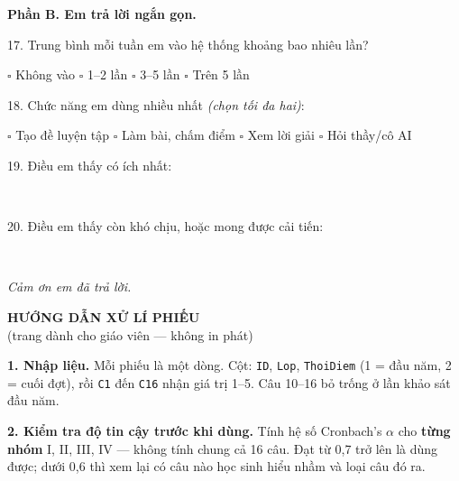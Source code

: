 \documentclass[12pt,a4paper]{article}
\begin{document}
\vspace{4pt}
\textbf{Phần B. Em trả lời ngắn gọn.}

\vspace{4pt}
17. Trung bình mỗi tuần em vào hệ thống khoảng bao nhiêu lần?

\quad $\square$ Không vào \quad $\square$ 1--2 lần \quad $\square$ 3--5 lần
\quad $\square$ Trên 5 lần

\vspace{6pt}
18. Chức năng em dùng nhiều nhất \textit{(chọn tối đa hai)}:

\quad $\square$ Tạo đề luyện tập \quad $\square$ Làm bài, chấm điểm
\quad $\square$ Xem lời giải \quad $\square$ Hỏi thầy/cô AI

\vspace{6pt}
19. Điều em thấy có ích nhất:

\vspace{2pt}\dotfill\\[4pt]\dotfill

\vspace{6pt}
20. Điều em thấy còn khó chịu, hoặc mong được cải tiến:

\vspace{2pt}\dotfill\\[4pt]\dotfill

\vspace{10pt}
\begin{center}\textit{Cảm ơn em đã trả lời.}\end{center}

\clearpage

\begin{center}{\large\textbf{HƯỚNG DẪN XỬ LÍ PHIẾU}}\\{\footnotesize (trang dành cho giáo viên --- không in phát)}\end{center}

\vspace{6pt}
\textbf{1. Nhập liệu.} Mỗi phiếu là một dòng. Cột: \texttt{ID}, \texttt{Lop},
\texttt{ThoiDiem} (1 = đầu năm, 2 = cuối đợt), rồi \texttt{C1} đến \texttt{C16}
nhận giá trị 1--5. Câu 10--16 bỏ trống ở lần khảo sát đầu năm.

\textbf{2. Kiểm tra độ tin cậy trước khi dùng.} Tính hệ số Cronbach's $\alpha$
cho \textbf{từng nhóm} I, II, III, IV --- không tính chung cả 16 câu. Đạt từ
0{,}7 trở lên là dùng được; dưới 0{,}6 thì xem lại có câu nào học sinh hiểu
nhầm và loại câu đó ra.
\end{document}
